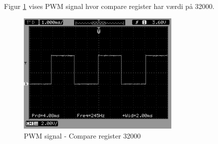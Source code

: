 Figur \ref{fig:PWM_3} vises PWM signal hvor compare register har værdi på 32000. 
\begin{figure}[H]
\centering
\includegraphics[width=0.7\textwidth]{Billeder/Test/PWM_32000.png}
\vspace{-0.0cm}
\caption{PWM signal - Compare register 32000}
\label{fig:PWM_3}
\end{figure}



 








